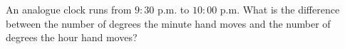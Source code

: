 An analogue clock runs from $9{:}30$ p.m. to $10{:}00$ p.m. What is the difference between the number of degrees the minute hand moves and the number of degrees the hour hand moves?
